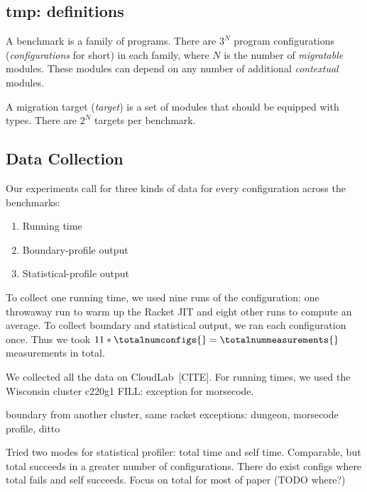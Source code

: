 
\subsection{tmp: definitions}

A benchmark is a family of programs.
There are $3^N$ program configurations (\emph{configurations} for short)
in each family, where $N$ is the number of \emph{migratable} modules.
These modules can depend on any number of additional \emph{contextual} modules.

A migration target (\emph{target}) is a set of modules that should be equipped
with types.
There are $2^N$ targets per benchmark.


\subsection{Data Collection}


Our experiments call for three kinds of data for every configuration across the benchmarks:
\begin{enumerate}
  \item Running time
  \item Boundary-profile output
  \item Statistical-profile output
\end{enumerate}

To collect one running time, we used nine runs of the configuration:
one throwaway run to warm up the Racket JIT and eight other runs to compute an average.
To collect boundary and statistical output, we ran each configuration once.
Thus we took $11 * \totalnumconfigs{} = \totalnummeasurements{}$ measurements in total.

We collected all the data on CloudLab~[CITE].
For running times, we used the Wisconsin cluster c220g1 
FILL: exception for morsecode.


boundary from another cluster, same racket
exceptions: dungeon, morsecode
profile, ditto

Tried two modes for statistical profiler: total time and self time.
Comparable, but total succeeds in a greater number of configurations.
There do exist configs where total fails and self succeeds.
Focus on total for most of paper (TODO where?)


